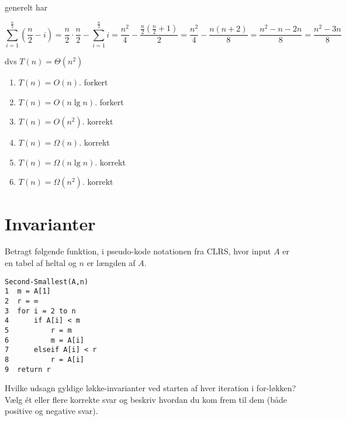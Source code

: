\documentclass{article}
\theoremstyle{definition}
\begin{document}
generelt har 

\[
\sum_{i=1}^{\frac{n}{2}} (\frac{n}{2} - i) = \frac{n}{2} \cdot \frac{n}{2} - \sum_{i=1}^{\frac{n}{2}} i = \frac{n^2}{4} - \frac{\frac{n}{2}(\frac{n}{2}+1)}{2} = \frac{n^2}{4} - \frac{n(n+2)}{8} = \frac{n^2-n-2n}{8} = \frac{n^2-3n}{8}
\]

dvs $T(n) = \Theta(n^2) $

\begin{enumerate}
    \item $T(n) = O(n)$. forkert
    \item $T(n) = O(n\lg n)$. forkert
    \item $T(n) = O(n^2)$. korrekt
    \item $T(n) = \Omega(n)$. korrekt 
    \item $T(n) = \Omega(n\lg n)$. korrekt
    \item $T(n) = \Omega(n^2)$. korrekt
\end{enumerate}

\section{Invarianter}
Betragt følgende funktion, i pseudo-kode notationen fra CLRS, hvor input $A$ er en tabel af heltal og $n$ er længden af $A$.

\begin{verbatim}
Second-Smallest(A,n)
1  m = A[1]
2  r = ∞
3  for i = 2 to n
4      if A[i] < m
5          r = m
6          m = A[i]
7      elseif A[i] < r
8          r = A[i]
9  return r
\end{verbatim}

Hvilke udsagn gyldige løkke-invarianter ved starten af hver iteration i for-løkken? Vælg ét eller flere korrekte svar og beskriv hvordan du kom frem til dem (både positive og negative svar).
\end{document}

